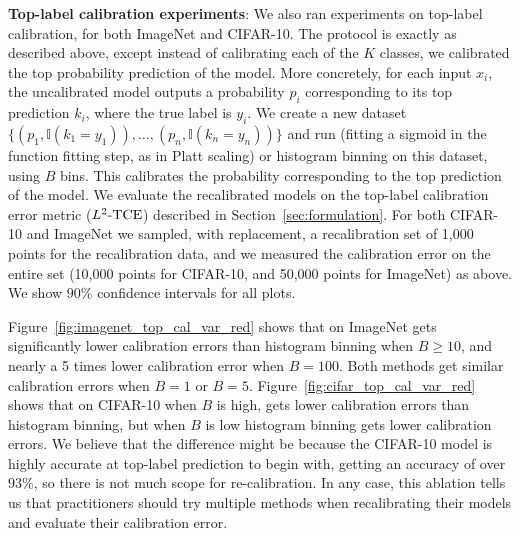 \textbf{Top-label calibration experiments}: We also ran experiments on top-label calibration, for both ImageNet and CIFAR-10. The protocol is exactly as described above, except instead of calibrating each of the $K$ classes, we calibrated the top probability prediction of the model. More concretely, for each input $x_i$, the uncalibrated model outputs a probability $p_i$ corresponding to its top prediction $k_i$, where the true label is $y_i$. We create a new dataset $\{(p_1, \mathbb{I}(k_1 = y_1)), \dots, (p_n, \mathbb{I}(k_n = y_n))\}$ and run \ourcal{} (fitting a sigmoid in the function fitting step, as in Platt scaling) or histogram binning on this dataset, using $B$ bins. This calibrates the probability corresponding to the top prediction of the model. We evaluate the recalibrated models on the top-label calibration error metric ($L^2\textup{-TCE}{}$) described in Section~\ref{sec:formulation}. For both CIFAR-10 and ImageNet we sampled, with replacement, a recalibration set of 1,000 points for the recalibration data, and we measured the calibration error on the entire set (10,000 points for CIFAR-10, and 50,000 points for ImageNet) as above. We show $90\%$ confidence intervals for all plots.

Figure~\ref{fig:imagenet_top_cal_var_red} shows that on ImageNet \ourcal{} gets significantly lower calibration errors than histogram binning when $B \geq 10$, and nearly a 5 times lower calibration error when $B = 100$. Both methods get similar calibration errors when $B = 1$ or $B = 5$. Figure~\ref{fig:cifar_top_cal_var_red} shows that on CIFAR-10 when $B$ is high, \ourcal{} gets lower calibration errors than histogram binning, but when $B$ is low histogram binning gets lower calibration errors. We believe that the difference might be because the CIFAR-10 model is highly accurate at top-label prediction to begin with, getting an accuracy of over $93\%$, so there is not much scope for re-calibration. In any case, this ablation tells us that practitioners should try multiple methods when recalibrating their models and evaluate their calibration error.


